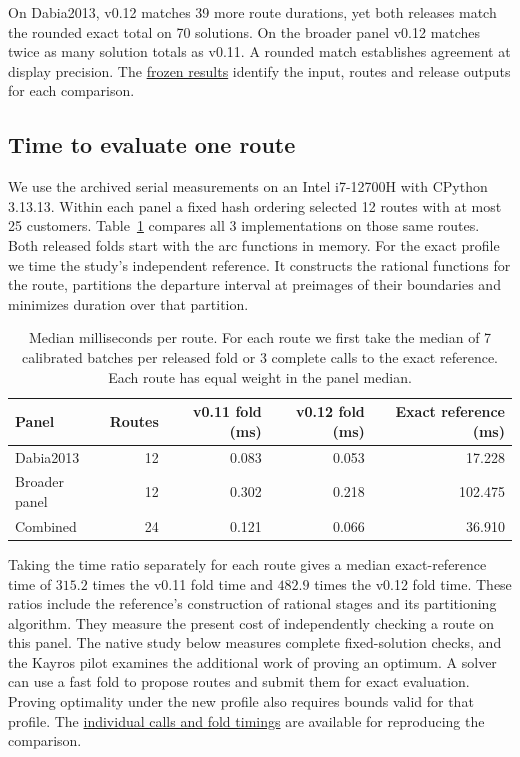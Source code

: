 On Dabia2013, v0.12 matches 39 more route durations, yet both releases match the rounded exact total on 70 solutions. On the broader panel v0.12 matches twice as many solution totals as v0.11. A rounded match establishes agreement at display precision. The \href{https://github.com/0nyr/routing-numerical-contracts/tree/75905c8827f959621ea808894e28136d248d2d15/results}{frozen results} identify the input, routes and release outputs for each comparison.

\subsection{Time to evaluate one route}

We use the archived serial measurements on an Intel i7-12700H with CPython 3.13.13. Within each panel a fixed hash ordering selected 12 routes with at most 25 customers. Table~\ref{tab:td-matched-runtime} compares all 3 implementations on those same routes. Both released folds start with the arc functions in memory. For the exact profile we time the study's independent reference. It constructs the rational functions for the route, partitions the departure interval at preimages of their boundaries and minimizes duration over that partition.

\begin{table}[htbp]
\centering
\small
\begin{tabular}{@{}lrrrr@{}}
\toprule
Panel & Routes & v0.11 fold (ms) & v0.12 fold (ms) & Exact reference (ms)\\
\midrule
Dabia2013 & 12 & 0.083 & 0.053 & 17.228\\
Broader panel & 12 & 0.302 & 0.218 & 102.475\\
Combined & 24 & 0.121 & 0.066 & 36.910\\
\bottomrule
\end{tabular}
\caption{Median milliseconds per route. For each route we first take the median of 7 calibrated batches per released fold or 3 complete calls to the exact reference. Each route has equal weight in the panel median.}\label{tab:td-matched-runtime}
\end{table}

Taking the time ratio separately for each route gives a median exact-reference time of $315.2$ times the v0.11 fold time and $482.9$ times the v0.12 fold time. These ratios include the reference's construction of rational stages and its partitioning algorithm. They measure the present cost of independently checking a route on this panel. The native study below measures complete fixed-solution checks, and the Kayros pilot examines the additional work of proving an optimum. A solver can use a fast fold to propose routes and submit them for exact evaluation. Proving optimality under the new profile also requires bounds valid for that profile. The \href{https://github.com/0nyr/routing-numerical-contracts/blob/75905c8827f959621ea808894e28136d248d2d15/results/controlled-td.json}{individual calls and fold timings} are available for reproducing the comparison.


\FloatBarrier

